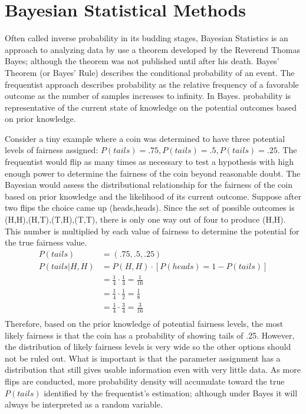 \chapter{Bayesian Statistical Methods}

Often called inverse probability in its budding stages, \cite{salsburg2002lady} Bayesian Statistics is an approach to analyzing data by use a theorem developed by the Reverend Thomas Bayes; although the theorem was not published until after his death.  Bayes' Theorem (or Bayes' Rule) describes the conditional probability of an event.  The frequentist approach describes probability as the relative frequency of a favorable outcome as the number of samples increases to infinity.  In Bayes.
probability is representative of the current state of knowledge on the potential outcomes based on prior knowledge.
 \begin{comment}
In Bayes, probability is the weighted sum of favorable outcomes multiplied by the plausibility of that outcome, divided by the total number of possible outcomes \cite{mcelreath2016statistical}
$$
P = \frac{\sum_i n_{\text{ ways to produce favorable outcome i}} \cdot p_{\text{ possibility of i}} }{N_{\text{total possible outcomes}}}
$$
\end{comment}

Consider a tiny example where a coin was determined to have three potential levels of fairness assigned: $P(tails) = .75, P(tails) = .5, P(tails) = .25$.  The frequentist would flip as many times as necessary to test a hypothesis with high enough power to determine the fairness of the coin beyond reasonable doubt.  The Bayesian would assess the distributional relationship for the fairness of the coin based on prior knowledge and the likelihood of its current outcome.
Suppose after two flips the choice came up (heads,heads).  Since the set of possible outcomes is (H,H),(H,T),(T,H),(T,T), there is only one way out of four to produce (H,H).  This number is multiplied by each value of fairness to determine the potential for the true fairness value.
\begin{align*}
P(tails) &= (.75, .5, .25) \\
P(tails|H,H) &= P(H,H) \cdot \left[ P(heads) = 1- P(tails) \right] \\
&= \frac{1}{4} \cdot \frac{1}{4} = \frac{1}{16} \\
&= \frac{1}{4} \cdot \frac{1}{2} = \frac{1}{8} \\
&= \frac{1}{4} \cdot \frac{3}{4} = \frac{3}{16} \\
\end{align*}
Therefore, based on the prior knowledge of potential fairness levels, the most likely fairness is that the coin has a probability of showing tails of .25.  However, the distribution of likely fairness levels is very wide so the other options should not be ruled out.  What is important is that the parameter assignment has a distribution that still gives usable information even with very little data. As more flips are conducted, more probability density will accumulate toward the true $P(tails)$ identified by the frequentist's estimation; although under Bayes it will always be interpreted as a random variable.


